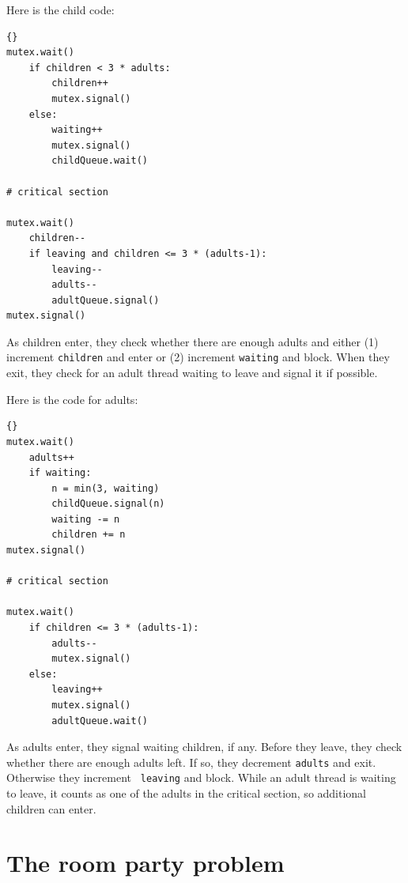 \documentclass{book}
\begin{document}
Here is the child code:

\begin{latin}
\begin{lstlisting}[title={Extended child care solution (child)}]{}
mutex.wait()
    if children < 3 * adults:
        children++
        mutex.signal()
    else:
        waiting++
        mutex.signal()
        childQueue.wait()

# critical section

mutex.wait()
    children--
    if leaving and children <= 3 * (adults-1):
        leaving--
        adults--
        adultQueue.signal() 
mutex.signal()
\end{lstlisting}
\end{latin}

As children enter, they check whether there are enough adults
and either (1) increment {\tt children} and enter or (2) increment
{\tt waiting} and block.
When they exit, they check for an adult thread waiting to leave and
signal it if possible.

\newpage
Here is the code for adults:

\begin{latin}
\begin{lstlisting}[title={Extended child care solution (adult)}]{}
mutex.wait()
    adults++
    if waiting:
        n = min(3, waiting)
        childQueue.signal(n)
        waiting -= n
        children += n
mutex.signal()

# critical section

mutex.wait()
    if children <= 3 * (adults-1):
        adults--
        mutex.signal()
    else:
        leaving++
        mutex.signal()
        adultQueue.wait() 
\end{lstlisting}
\end{latin}

As adults enter, they signal waiting children, if any.  Before they
leave, they check whether there are enough adults left.  If so, they
decrement {\tt adults} and exit.  Otherwise they increment {\tt
leaving} and block.  While an adult thread is waiting to leave, it
counts as one of the adults in the critical section, so additional
children can enter.





\newpage
\section{The room party problem}
\end{document}
